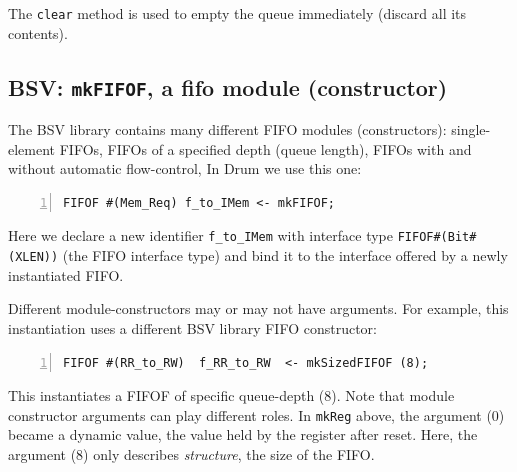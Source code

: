 The \verb|clear| method is used to empty the queue immediately
(discard all its contents).


\subsection{BSV: {\tt mkFIFOF}, a fifo module (constructor)}



The BSV library contains many different FIFO modules (constructors):
single-element FIFOs, FIFOs of a specified depth (queue length), FIFOs
with and without automatic flow-control, {\etc} In Drum we use
this one:


\begin{Verbatim}[frame=single, numbers=left]
   FIFOF #(Mem_Req) f_to_IMem <- mkFIFOF;
\end{Verbatim}

Here we declare a new identifier \verb|f_to_IMem| with interface type
\verb|FIFOF#(Bit#(XLEN))| (the FIFO interface type) and bind it to the
interface offered by a newly instantiated FIFO.

Different module-constructors may or may not have arguments.  For
example, this instantiation uses a different BSV library FIFO
constructor:


\begin{Verbatim}[frame=single, numbers=left]
   FIFOF #(RR_to_RW)  f_RR_to_RW  <- mkSizedFIFOF (8);
\end{Verbatim}

This instantiates a FIFOF of specific queue-depth (8).  Note that
module constructor arguments can play different roles.  In
\verb|mkReg| above, the argument (0) became a dynamic value, the value
held by the register after reset.  Here, the argument (8) only
describes \emph{structure}, {\ie} the size of the FIFO.

